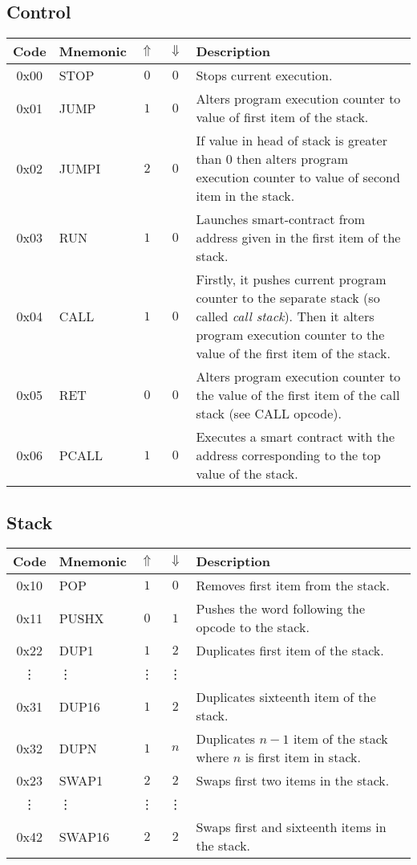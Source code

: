\documentclass[12pt,a4paper]{article}
\begin{document}
\subsection{Control}
\begin{tabularx}{\textwidth}{ c l c c p{7cm} }
\textbf{Code} & \textbf{Mnemonic} & \textbf{$\Uparrow$} & \textbf{$\Downarrow$} & \textbf{Description} \\
\hline
0x00 & STOP & $0$ & $0$ & Stops current execution. \\
\hline
0x01 & JUMP & $1$ & $0$ & Alters program execution counter to value of first item of the stack. \\
\hline
0x02 & JUMPI & $2$ & $0$ & If value in head of stack is greater than 0 then alters program execution counter to value of second item in the stack.  \\
\hline
0x03 & RUN & $1$ & $0$ & Launches smart-contract from address given in the first item of the stack.  \\
\hline
0x04 & CALL & $1$ & $0$ & Firstly, it pushes current program counter to the separate stack (so called \emph{call stack}). Then it alters program execution counter to the value of the first item of the stack.  \\
\hline
0x05 & RET & $0$ & $0$ & Alters program execution counter to the value of the first item of the call stack (see CALL opcode).  \\
\hline
0x06 & PCALL & $1$ & $0$ & Executes a smart contract with the address corresponding to the top value of the stack.  \\

\end{tabularx}

\subsection{Stack}
\begin{tabularx}{\textwidth}{ c l c c p{7cm} }
\textbf{Code} & \textbf{Mnemonic} & \textbf{$\Uparrow$} & \textbf{$\Downarrow$} & \textbf{Description} \\
\hline
0x10 & POP & $1$ & $0$ & Removes first item from the stack. \\
\hline
0x11 & PUSHX & $0$ & $1$ & Pushes the word following the opcode to the stack. \\
\hline
0x22 & DUP1 & $1$ & $2$ & Duplicates first item of the stack. \\
\vdots & \vdots & \vdots & \vdots \\
0x31 & DUP16 & $1$ & $2$ & Duplicates sixteenth item of the stack. \\
\hline
0x32 & DUPN & $1$ & $n$ & Duplicates $n-1$ item of the stack where $n$ is first item in stack. \\
\hline
0x23 & SWAP1 & $2$ & $2$ & Swaps first two items in the stack. \\
\vdots & \vdots & \vdots & \vdots \\
0x42 & SWAP16 & $2$ & $2$ & Swaps first and sixteenth items in the stack. \\
\hline
\end{tabularx}
\end{document}

